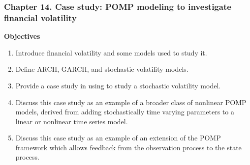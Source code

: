 \documentclass{beamer}\usepackage[]{graphicx}\usepackage[]{color}
\newcommand\CHAPTER{14}
\begin{document}









\begin{frame}[fragile]
\frametitle{Chapter \CHAPTER. Case study: POMP modeling to investigate financial volatility}

\hspace{3cm} {\large \bf Objectives}

\vspace{3mm}

\begin{enumerate}

\item Introduce financial volatility and some models used to study it.

\item Define ARCH, GARCH, and stochastic volatility models. 

\item Provide a case study in using  to study a stochastic volatility model.

\item Discuss this case study as an example of a broader class of nonlinear POMP models, derived from adding stochastically time varying parameters to a linear or nonlinear time series model.

\item Discuss this case study as an example of an extension of the POMP framework which allows feedback from the observation process to the state process.

\end{enumerate}

\end{frame}
\end{document}
